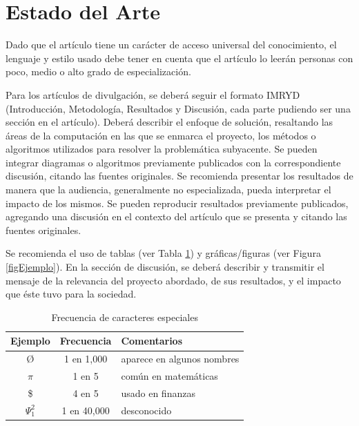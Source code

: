 \documentclass[sigconf]{acmart}
\begin{document}

\section{Estado del Arte}

Dado que el artículo tiene un carácter de acceso universal del conocimiento, el lenguaje y estilo usado debe tener en cuenta que el artículo lo leerán personas con poco, medio o alto grado de especialización. 

Para los artículos de divulgación, se deberá seguir el formato IMRYD (Introducción, Metodología, Resultados y Discusión, cada parte pudiendo ser una sección en el artículo). Deberá describir el enfoque de solución, resaltando las áreas de la computación en las que se enmarca el proyecto, los métodos o algoritmos utilizados para resolver la problemática subyacente. Se pueden integrar diagramas o algoritmos previamente publicados con la correspondiente discusión, citando las fuentes originales.
Se recomienda presentar los resultados de manera que la audiencia, generalmente no especializada, pueda interpretar el impacto de los mismos. Se pueden reproducir resultados previamente publicados, agregando una discusión en el contexto del artículo que se presenta y citando las fuentes originales.

Se recomienda el uso de tablas (ver Tabla \ref{tab:freq}) y gráficas/figuras (ver Figura \ref{figEjemplo}). 
En la sección de discusión, se deberá describir y transmitir el mensaje de la relevancia del proyecto abordado, de sus resultados, y el impacto que éste tuvo para la sociedad.

\begin{table}
  \caption{Frecuencia de caracteres especiales}
  \label{tab:freq}
  \begin{tabular}{ccl}
    \toprule
    Ejemplo&Frecuencia&Comentarios\\
    \midrule
    \O & 1 en 1,000& aparece en algunos nombres\\
    $\pi$ & 1 en 5& común en matemáticas\\
    \$ & 4 en 5 & usado en finanzas\\
    $\Psi^2_1$ & 1 en 40,000& desconocido\\
  \bottomrule
\end{tabular}
\end{table}
\end{document}

